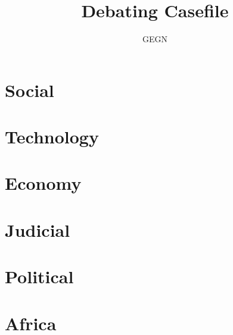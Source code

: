 \documentclass[10pt, a5paper]{book}
\author{GEGN}
\title{Debating Casefile}
\begin{document}
\textbf{}



\begin{multicols}{2}
{\scriptsize \tableofcontents}
\vfill\null

\end{multicols}
\pagebreak

\pagebreak



\begin{multicols}{2}

\chapter{Social}






\chapter{Technology}



\chapter{Economy}




\chapter{Judicial}




\chapter{Political}




\chapter{Africa}



\end{multicols}
\end{document}
